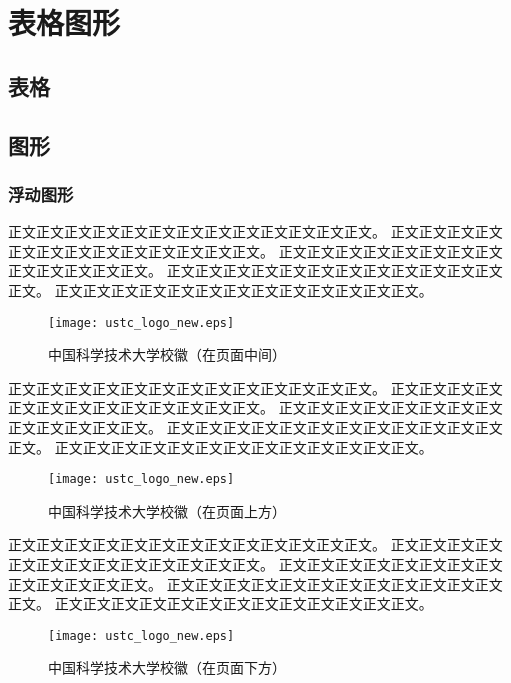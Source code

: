 ﻿
\chapter{表格图形}
\label{chap:tabfig}

\section{表格}


\section{图形}

\subsection{浮动图形}

正文正文正文正文正文正文正文正文正文正文正文正文正文。
正文正文正文正文正文正文正文正文正文正文正文正文正文。
正文正文正文正文正文正文正文正文正文正文正文正文正文。
正文正文正文正文正文正文正文正文正文正文正文正文正文。
正文正文正文正文正文正文正文正文正文正文正文正文正文。

\begin{figure}[h]
 \centering
 \texttt{[image: ustc\_logo\_new.eps]}
 \caption{中国科学技术大学校徽（在页面中间）} 
 \label{fig:amss1}
\end{figure}

正文正文正文正文正文正文正文正文正文正文正文正文正文。
正文正文正文正文正文正文正文正文正文正文正文正文正文。
正文正文正文正文正文正文正文正文正文正文正文正文正文。
正文正文正文正文正文正文正文正文正文正文正文正文正文。
正文正文正文正文正文正文正文正文正文正文正文正文正文。

\begin{figure}[t]
 \centering
 \texttt{[image: ustc\_logo\_new.eps]}
 \caption{中国科学技术大学校徽（在页面上方）}
 \label{fig:amss2}
\end{figure}

正文正文正文正文正文正文正文正文正文正文正文正文正文。
正文正文正文正文正文正文正文正文正文正文正文正文正文。
正文正文正文正文正文正文正文正文正文正文正文正文正文。
正文正文正文正文正文正文正文正文正文正文正文正文正文。
正文正文正文正文正文正文正文正文正文正文正文正文正文。

\begin{figure}[b]
 \centering
 \texttt{[image: ustc\_logo\_new.eps]}
 \caption{中国科学技术大学校徽（在页面下方）}
 \label{fig:amss3}
\end{figure}


